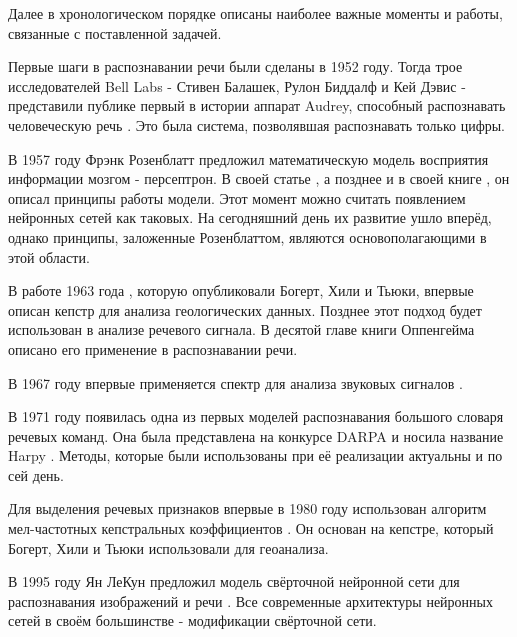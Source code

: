 Далее в хронологическом порядке описаны наиболее важные моменты и работы, связанные с поставленной задачей.

Первые шаги в распознавании речи были сделаны в 1952 году. Тогда трое исследователей Bell Labs - Стивен Балашек, Рулон Биддалф и Кей Дэвис - представили публике первый в истории аппарат Audrey, способный распознавать человеческую речь \cite{Audrey}. Это была система, позволявшая распознавать только цифры. 

В 1957 году Фрэнк Розенблатт предложил математическую модель восприятия информации мозгом - персептрон. В своей статье \cite{PerceptronArticle}, а позднее и в своей книге \cite{PerceptronBook}, он описал принципы работы модели. Этот момент можно считать появлением нейронных сетей как таковых. На сегодняшний день их развитие ушло вперёд, однако принципы, заложенные Розенблаттом, являются основополагающими в этой области.

В работе 1963 года \cite{Cepstrum}, которую опубликовали Богерт, Хили и Тьюки, впервые описан кепстр для анализа геологических данных. Позднее этот подход будет использован в анализе речевого сигнала. В десятой главе книги Оппенгейма \cite{CeptrumExplanation} описано его применение в распознавании речи.

В 1967 году впервые применяется спектр для анализа звуковых сигналов \cite{Spectrum}.

В 1971 году появилась одна из первых моделей распознавания большого словаря речевых команд. Она была представлена на конкурсе DARPA и носила название Harpy \cite{Harpy}. Методы, которые были использованы при её реализации актуальны и по сей день.

Для выделения речевых признаков впервые в 1980 году использован алгоритм мел-частотных кепстральных коэффициентов \cite{MFCC}. Он основан на кепстре, который Богерт, Хили и Тьюки использовали для геоанализа.

В 1995 году Ян ЛеКун предложил модель свёрточной нейронной сети для распознавания изображений и речи \cite{CNN}. Все современные архитектуры нейронных сетей в своём большинстве - модификации свёрточной сети.